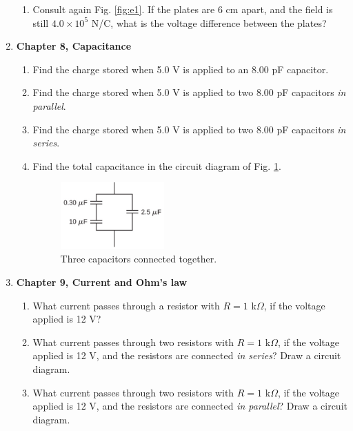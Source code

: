 \documentclass[10pt]{article}
\begin{document}
\begin{enumerate}
\begin{enumerate}
\item Consult again Fig. \ref{fig:e1}.  If the plates are 6 cm apart, and the field is still $4.0 \times 10^5$ N/C, what is the voltage difference between the plates? \\ \vspace{2cm}
\end{enumerate}
\item \textbf{Chapter 8, Capacitance}
\begin{enumerate}
\item Find the charge stored when 5.0 V is applied to an 8.00 pF capacitor. \\ \vspace{1cm}
\item Find the charge stored when 5.0 V is applied to two 8.00 pF capacitors \textit{in parallel}. \\ \vspace{1cm}
\item Find the charge stored when 5.0 V is applied to two 8.00 pF capacitors \textit{in series}. \\ \vspace{1cm}
\item Find the total capacitance in the circuit diagram of Fig. \ref{fig:c1}. \\ \vspace{2cm}
\begin{figure}
\centering
\includegraphics[width=0.4\textwidth]{figures/c1.png}
\caption{\label{fig:c1} Three capacitors connected together.}
\end{figure}
\end{enumerate}
\item \textbf{Chapter 9, Current and Ohm's law}
\begin{enumerate}
\item What current passes through a resistor with $R=1$ k$\Omega$, if the voltage applied is 12 V? \\ \vspace{1cm}
\item What current passes through two resistors with $R=1$ k$\Omega$, if the voltage applied is 12 V, and the resistors are connected \textit{in series}? Draw a circuit diagram. \\ \vspace{2cm}
\item What current passes through two resistors with $R=1$ k$\Omega$, if the voltage applied is 12 V, and the resistors are connected \textit{in parallel}? Draw a circuit diagram. \\ \vspace{2cm}
\end{enumerate}
\end{enumerate}
\end{document}
